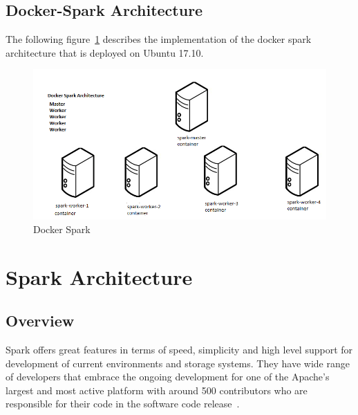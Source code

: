 \subsection{Docker-Spark Architecture} 
The following figure~\ref{s:archidocker} describes the implementation of 
the docker spark architecture that is deployed on Ubuntu 17.10.

\begin{figure}[!ht]
\centering\includegraphics[width=\textwidth]{images/dockerspark.png}
\caption{Docker Spark}\label{sa:archidocker}\label{s:archidocker}
\end{figure}




\section{Spark Architecture}



\subsection{Overview}
Spark offers great features in terms of speed, simplicity and high level support
 for development of current environments and storage systems. They have wide 
 range of developers that embrace the ongoing development for one of the 
 Apache's largest and most active platform with around 500 contributors who are 
 responsible for their code in the software code release~\cite{hid-sp18-410-spark-architecture}.

